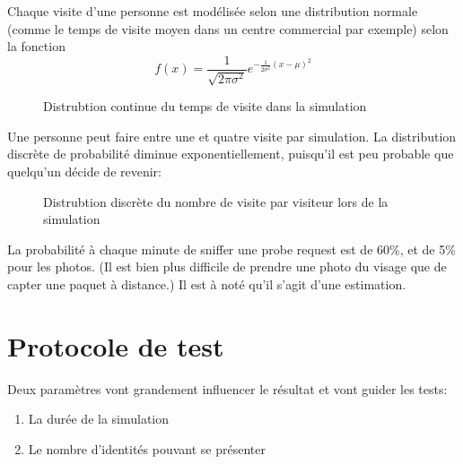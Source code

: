 Chaque visite d'une personne est modélisée selon une distribution normale (comme le temps de visite moyen dans un centre commercial par exemple) selon la fonction
\[f(x)=\frac{1}{\sqrt{2\pi \sigma^2}} e^{-\frac{1}{2\sigma^2}(x-\mu)^2}\]

\begin{figure}[H]
\caption{Distrubtion continue du temps de visite dans la simulation}
\end{figure}

Une personne peut faire entre une et quatre visite par simulation.
La distribution discrète de probabilité diminue exponentiellement, puisqu'il est peu probable que quelqu'un décide de revenir:

\begin{figure}[H]
  \caption{Distrubtion discrète du nombre de visite par visiteur lors de la simulation}
\end{figure}

La probabilité à chaque minute de sniffer une probe request est de 60\%, et de 5\% pour les photos. (Il est bien plus difficile de prendre une photo du visage que de 
capter une paquet à distance.) Il est à noté qu'il s'agit d'une estimation.

\section{Protocole de test}
Deux paramètres vont grandement influencer le résultat et vont guider les tests:
\begin{enumerate}
    \item La durée de la simulation
    \item Le nombre d'identités pouvant se présenter
\end{enumerate}

